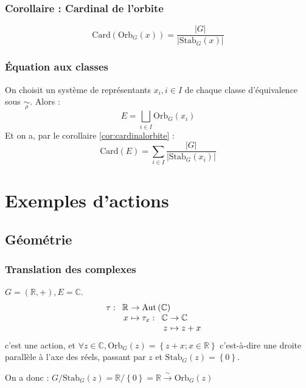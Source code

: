 \documentclass[a4paper,10pt]{report}
\newcommand{\set}[1]{\left\lbrace #1 \right\rbrace } %
\newcommand{\IR}{\mathbb{R}} %
\newcommand{\IC}{\mathbb{C}} %
\newcommand{\bij}{\overset{\sim}{\to}} %
\newcommand{\abs}[1]{\left\vert #1 \right\vert} %
\newcommand{\Aut}[1]{\text{Aut}\left(#1\right)}
\newcommand{\Orb}[2]{\text{Orb}_{#1}\left( #2 \right)}
\newcommand{\Stab}[2]{\text{Stab}_{#1}\left( #2 \right)}
\newcommand{\Card}[1]{\text{Card}\left( #1 \right)}
\begin{document}
   \subsection{Corollaire : Cardinal de l'orbite\label{cor:cardinalorbite}}
    $$\Card{\Orb{G}{x}} = \frac{\abs{G}}{\abs{\Stab{G}{x}}}$$

   \subsection{Équation aux classes}
    On choisit un système de représentants $x_i, i \in I$ de chaque classe
    d'équivalence sous $\underset{\rho}{\sim}$. Alors :
    $$E = \bigsqcup_{i\in I} \Orb{G}{x_i}$$
    Et on a, par le corollaire \ref{cor:cardinalorbite} : 
    $$\Card{E} = \sum_{i\in I}\frac{\abs{G}}{\abs{\Stab{G}{x_i}}}$$

 \chapter{Exemples d'actions}
  \begin{comment}
    cours 03/12/08 p2
  \end{comment}

  \section{Géométrie}
   \subsection{Translation des complexes}
    $G=(\IR, +), E = \IC$.
    $$\tau:
    \begin{array}[t]{r@{\ }l}
      \IR & \to \Aut{\IC}\\
      x & \mapsto \tau_x : 
      \begin{array}[t]{r@{\ }l}
	\IC & \to \IC\\
	z & \mapsto z +x
      \end{array}
    \end{array}$$
    c'est une action, et $\forall z \in \IC, \Orb{G}{z}=\set{z+x; x \in \IR}$
    c'est-à-dire une droite parallèle à l'axe des réels, passant par $z$ et
    $\Stab{G}{z}=\set{0}$.

    On a donc : $G/\Stab{G}{z}=\IR/\set{0}=\IR \bij \Orb{G}{z}$
\end{document}
